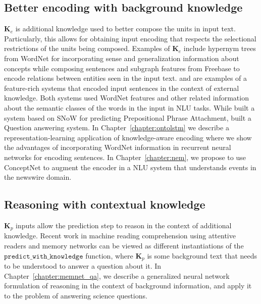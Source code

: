 \subsection{Better encoding with background knowledge}
$\mathbf{K}_e$ is additional knowledge used to better compose the units in input text. Particularly, this allows for
obtaining input encoding that respects the selectional restrictions of the units being composed.
Examples of $\mathbf{K}_e$ include hypernym trees from WordNet for
incorporating sense and generalization information about concepts while composing sentences and subgraph features from Freebase to encode relations
between entities seen in the input text. \cite{moldovan2001logic} and \cite{krymolowski1998incorporating} are examples of a feature-rich systems that encoded input sentences in the 
context of external knowledge. Both systems used WordNet features and other related information about the semantic classes of the words in the input in NLU tasks. While \cite{krymolowski1998incorporating} 
built a system based on SNoW \cite{CCRR99} for predicting Prepositional Phrase Attachment, \cite{moldovan2001logic} built a Question answering system. In Chapter~\ref{chapter:ontolstm} we describe
a representation-learning application of knowledge-aware encoding where we show the advantages of incorporating WordNet information in recurrent neural networks for encoding sentences. In Chapter~\ref{chapter:nem},
we propose to use ConceptNet \citep{liu2004conceptnet} to augment the encoder in a NLU system that understands events in the newswire domain.

\subsection{Reasoning with contextual knowledge}
$\textbf{K}_p$ inputs allow the prediction step to reason in the context of additional knowledge. Recent work in machine reading comprehension using 
attentive readers \cite{hermann2015teaching} and memory networks \cite{weston2014memory,Sukhbaatar2015EndToEndMN,Xiong2016DynamicMN} can be viewed as different instantiations
of the $\mathtt{predict\_with\_knowledge}$ function, where $\textbf{K}_p$ is some background text that needs to be understood to answer a question about it. 
In Chapter~\ref{chapter:memnet_qa}, we describe a generalized neural network formulation of reasoning in the context of background information,
and apply it to the problem of answering science questions.

